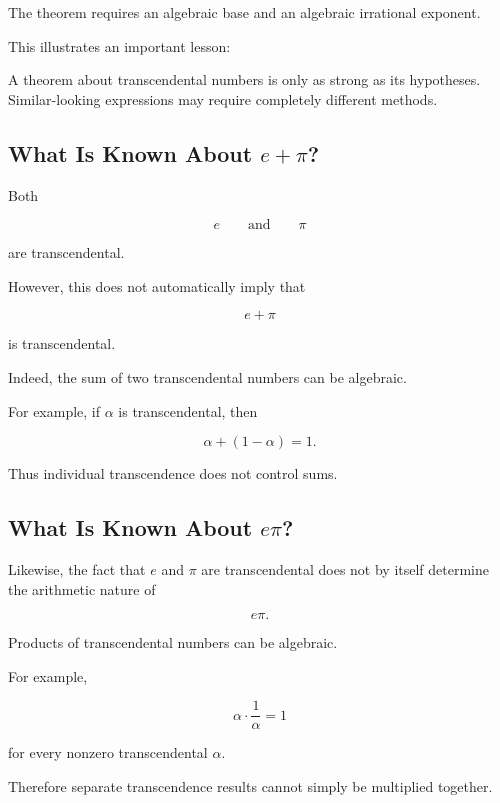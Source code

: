 The theorem requires an algebraic base and an algebraic irrational exponent.

This illustrates an important lesson:

\begin{conceptbox}
A theorem about transcendental numbers is only as strong as its hypotheses.
Similar-looking expressions may require completely different methods.
\end{conceptbox}

\subsection{What Is Known About \(e+\pi\)?}
\label{subsec:e-plus-pi}

Both

\[ e\qquad\text{and}\qquad\pi \]

are transcendental.

However, this does not automatically imply that

\[ e+\pi \]

is transcendental.

Indeed, the sum of two transcendental numbers can be algebraic.

For example, if \(\alpha\) is transcendental, then

\[ \alpha+(1-\alpha)=1. \]

Thus individual transcendence does not control sums.

\subsection{What Is Known About \(e\pi\)?}
\label{subsec:e-times-pi}

Likewise, the fact that \(e\) and \(\pi\) are transcendental does not by
itself determine the arithmetic nature of

\[ e\pi. \]

Products of transcendental numbers can be algebraic.

For example,

\[ \alpha\cdot\frac1\alpha=1 \]

for every nonzero transcendental \(\alpha\).

Therefore separate transcendence results cannot simply be multiplied
together.

